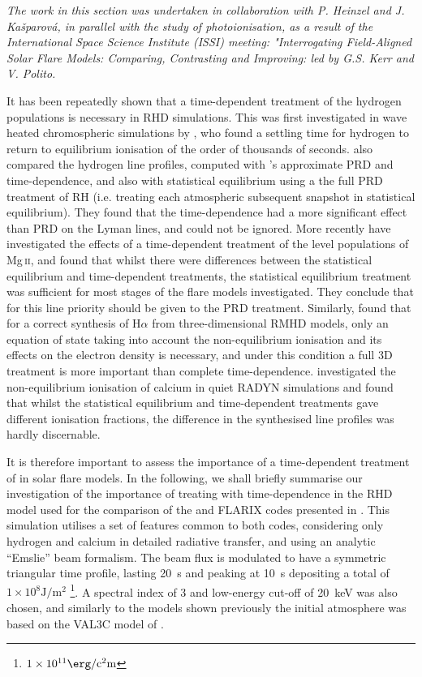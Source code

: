 \emph{The work in this section was undertaken in collaboration with P. Heinzel and J. Kašparová, in parallel with the study of \Caii{} photoionisation, as a result of the International Space Science Institute (ISSI) meeting: "Interrogating Field-Aligned Solar Flare Models: Comparing, Contrasting and Improving: led by G.S. Kerr and V. Polito.}

It has been repeatedly shown that a time-dependent treatment of the hydrogen populations is necessary in RHD simulations.
This was first investigated in wave heated chromospheric simulations by \citet{Carlsson2002}, who found a settling time for hydrogen to return to equilibrium ionisation of the order of thousands of seconds.
\citet{Brown2018} also compared the hydrogen line profiles, computed with \Radyn{}'s approximate PRD and time-dependence, and also with statistical equilibrium using a the full PRD treatment of RH (i.e. treating each atmospheric subsequent snapshot in statistical equilibrium).
They found that the time-dependence had a more significant effect than PRD on the Lyman lines, and could not be ignored.
More recently \citet{Kerr2019a} have investigated the effects of a time-dependent treatment of the level populations of Mg\,\textsc{ii}, and found that whilst there were differences between the statistical equilibrium and time-dependent treatments, the statistical equilibrium treatment was sufficient for most stages of the flare models investigated.
They conclude that for this line priority should be given to the PRD treatment.
Similarly, \citet{Leenaarts2012a} found that for a correct synthesis of H$\alpha$ from three-dimensional RMHD models, only an equation of state taking into account the non-equilibrium ionisation and its effects on the electron density is necessary, and under this condition a full 3D treatment is more important than complete time-dependence.
\citet{Wedemeyer-Bohm2011} investigated the non-equilibrium ionisation of calcium in quiet RADYN simulations and found that whilst the statistical equilibrium and time-dependent treatments gave different ionisation fractions, the difference in the synthesised line profiles was hardly discernable.

It is therefore important to assess the importance of a time-dependent treatment of \Caii{} in solar flare models.
In the following, we shall briefly summarise our investigation of the importance of treating \Caii{} with time-dependence in the RHD model used for the comparison of the \Radyn{} and FLARIX codes presented in \citet{Kasparova2019}.
This simulation utilises a set of features common to both codes, considering only hydrogen and calcium in detailed radiative transfer, and using an analytic ``Emslie'' beam formalism.
The beam flux is modulated to have a symmetric triangular time profile, lasting \SI{20}{\second} and peaking at \SI{10}{\second} depositing a total of $1\times{}10^8\si{\joule\per\square\metre}$ \footnote{$1\times{}10^{11}\si{\erg\per\square\centi\metre}$}.
A spectral index of 3 and low-energy cut-off of \SI{20}{\kilo\electronvolt} was also chosen, and similarly to the models shown previously the initial atmosphere was based on the VAL3C model of \citet{Vernazza1981}.

